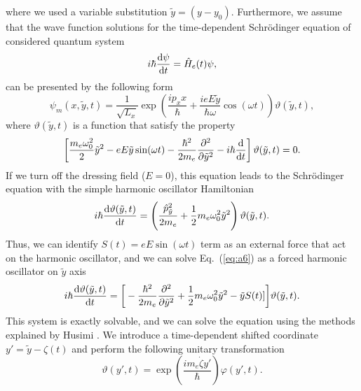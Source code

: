 \documentclass[
 reprint,
 amsmath,amssymb,
 aps,
 prb,
]{revtex4-2}
\begin{document}
\begin{appendix}
where we used a variable substitution $\tilde{y} = (y - y_0)$. Furthermore, we assume that the wave function solutions for the time-dependent Schrödinger equation of considered quantum system
\begin{equation} \label{eq:a4}
    i \hbar \dv{\psi}{t} = \hat{H}_e(t)\psi,
\end{equation}
can be presented by the following form
\begin{equation} \label{eq:a5}
    \psi_m(x,\tilde{y},t) = \frac{1}{\sqrt{L_x}}
    \exp\left(
      \frac{ip_x x}{\hbar} +
      \frac{ieE\tilde{y}}{\hbar \omega}\cos(\omega t)
    \right) \vartheta(\tilde{y},t),
\end{equation}
where $\vartheta(\tilde{y},t)$ is a function that satisfy the property
\begin{equation} \label{eq:a6}
    \left[
    \frac{m_e \omega_0^2}{2} \tilde{y}^2
    - {eE\tilde{y}}\sin(\omega t)
    - \frac{\hbar^2}{2m_e} \pdv[2]{\tilde{y}}
    - i \hbar \dv{t}
    \right]
    \vartheta(\tilde{y},t) = 0.
\end{equation}
If we turn off the dressing field ($E=0$), this equation leads to the Schrödinger equation with the simple harmonic oscillator Hamiltonian
\begin{equation} \label{eq:a7}
     i \hbar \dv{\vartheta(\tilde{y},t)}{t} =
    \left(
    \frac{\hat{p}_{\tilde{y}}^2}{2m_e} +
    \frac{1}{2}m_e \omega_0^2\tilde{y}^2
    \right)
    \vartheta(\tilde{y},t).
\end{equation}
Thus, we can identify $S(t) = eE\sin(\omega t)$ term as an external force that act on the harmonic oscillator, and we can solve Eq.~(\ref{eq:a6}) as a forced harmonic oscillator on $\tilde{y}$ axis
\begin{equation} \label{eq:a8}
  \begin{aligned}
    i \hbar \dv{\vartheta(\tilde{y},t)}{t} =
    \bigg[
    -
    \frac{\hbar^2}{2m_e}
    \pdv[2]{\tilde{y}} +
    \frac{1}{2}m_e \omega_0^2\tilde{y}^2
    - \tilde{y}S(t)]
    \bigg]
    \vartheta(\tilde{y},t).
  \end{aligned}
\end{equation}
This system is exactly solvable, and we can solve the equation using the methods explained by Husimi \cite{husimi53}. We introduce a time-dependent shifted coordinate $ y' = \tilde{y} - \zeta(t)$ and perform the following unitary transformation
\begin{equation} \label{eq:a9}
    \vartheta(y',t) = \exp(\frac{im_e\dot{\zeta}y'}{\hbar})\varphi(y',t).
\end{equation}

\end{appendix}
\end{document}
